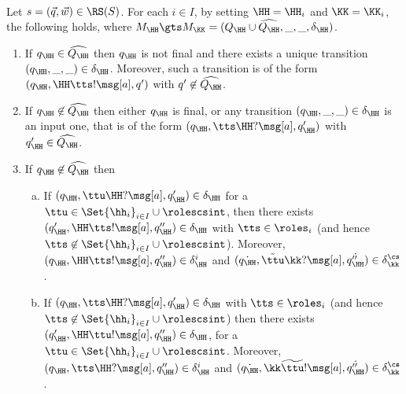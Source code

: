 \begin{lemma}\hfill\\
\label{fact:uniquesending}
Let $s= (\vec{q},\vec{w}) \in \RS(S)$. %
For each $i\in I$, by setting $\HH=\HH_i$  and $\KK=\KK_i$,  the following holds, where
$M_\HH\gts M_\KK= (Q_\HH\cup\widehat{Q_\HH}, \_,\_,  \delta_\HH)$.
\begin{enumerate}
\item
\label{fact:uniquesending-i}
If ${q_\HH} \in\widehat{Q_\HH}$ then
${q_\HH}$ is not final and
 there exists a unique transition $({q_\HH},\_,\_)\in\delta_\HH$.
  Moreover, such a transition is of the form
 $(q_\HH,\HH\tts!\msg[a],q')$ with $q'\not\in\widehat{Q_\HH}$.

\item
\label{fact:uniquesending-ii}
If ${q_\HH}\not\in\widehat{Q_\HH}$ then either $q_\HH$ is final, or any transition $({q_\HH},\_,\_)\in\delta_\HH$
is an input  one, that 
is of the form $({q_\HH},\tts\HH?\msg[a],{q'_\HH})$ with ${q'_\HH}\in\widehat{Q_\HH}$. 
\item
\label{fact:uniquesending-iii}
If ${q_\HH}\not\in\widehat{Q_\HH}$ then 
             \begin{enumerate}[a)]
\item
\label{fact:uniquesending-iiia}

If $(q_\HH,{\ttu}\HH?\msg[a],{q'_\HH})\in\delta_\HH$ for a $\ttu\in\Set{\hh_i}_{i\in I}\cup\rolescsint$,  then there exists $({q'_\HH},\HH\tts!\msg[a],q''_\HH)\in\delta_\HH$ with $\tts \in \roles_i$ 
(and hence $\tts\not\in\Set{\hh_i}_{i\in I}\cup\rolescsint$). 
Moreover, $(q_\HH,\HH\tts!\msg[a],q''_\HH)\in\delta^i_\HH$ and 
$(\dot{q_\HH},\tilde{\ttu}\kk?\msg[a],\dot{q''_\HH})\in\delta^{\cs}_{\kk}$.

\item\label{fact:uniquesending-iiib}

If $(q_\HH,\tts\HH?\msg[a], {q'_\HH})\in\delta_\HH$ with $\tts \in \roles_i$ 
(and hence $\tts\not\in\Set{\hh_i}_{i\in I}\cup\rolescsint$)  then there exists   $({q'_\HH},\HH\ttu!\msg[a],q''_\HH)\in\delta_\HH$,
for a $\ttu\in\Set{\hh_i}_{i\in I}\cup\rolescsint$. 
Moreover, $(q_\HH,\tts\HH?\msg[a],q''_\HH)\in\delta^i_\HH$ and 
$(\dot{q_\HH},\kk\widetilde{\ttu}!\msg[a],\dot{q''_\HH})\in\delta^{\cs}_{\kk}$.

\end{enumerate}
\end{enumerate}
\end{lemma}

